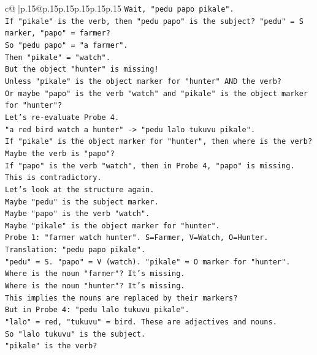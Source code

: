 \documentclass{article}
\begin{document}
{\begin{supertabular}{c@{$\;$}|p{.15\linewidth}@{}p{.15\linewidth}p{.15\linewidth}p{.15\linewidth}p{.15\linewidth}p{.15\linewidth}}
{{{\texttt{Wait, "pedu papo pikale".} \\
\texttt{If "pikale" is the verb, then "pedu papo" is the subject? "pedu" = S marker, "papo" = farmer?} \\
\texttt{So "pedu papo" = "a farmer".} \\
\texttt{Then "pikale" = "watch".} \\
\texttt{But the object "hunter" is missing!} \\
\texttt{Unless "pikale" is the object marker for "hunter" AND the verb?} \\
\texttt{Or maybe "papo" is the verb "watch" and "pikale" is the object marker for "hunter"?} \\
\texttt{Let's re{-}evaluate Probe 4.} \\
\texttt{"a red bird watch a hunter" {-}> "pedu lalo tukuvu pikale".} \\
\texttt{If "pikale" is the object marker for "hunter", then where is the verb?} \\
\texttt{Maybe the verb is "papo"?} \\
\texttt{If "papo" is the verb "watch", then in Probe 4, "papo" is missing.} \\
\texttt{This is contradictory.} \\
\texttt{Let's look at the structure again.} \\
\texttt{Maybe "pedu" is the subject marker.} \\
\texttt{Maybe "papo" is the verb "watch".} \\
\texttt{Maybe "pikale" is the object marker for "hunter".} \\
\texttt{Probe 1: "farmer watch hunter". S=Farmer, V=Watch, O=Hunter.} \\
\texttt{Translation: "pedu papo pikale".} \\
\texttt{"pedu" = S. "papo" = V (watch). "pikale" = O marker for "hunter".} \\
\texttt{Where is the noun "farmer"? It's missing.} \\
\texttt{Where is the noun "hunter"? It's missing.} \\
\texttt{This implies the nouns are replaced by their markers?} \\
\texttt{But in Probe 4: "pedu lalo tukuvu pikale".} \\
\texttt{"lalo" = red, "tukuvu" = bird. These are adjectives and nouns.} \\
\texttt{So "lalo tukuvu" is the subject.} \\
\texttt{"pikale" is the verb?} \\
}}}
\end{supertabular}}
\end{document}
